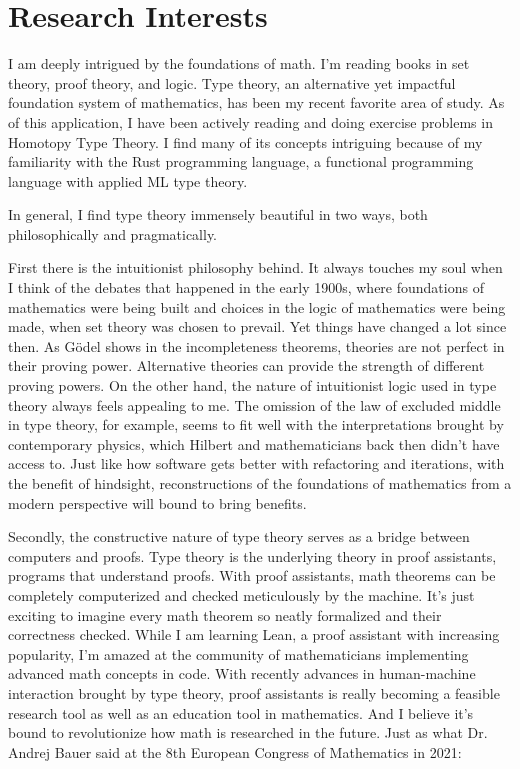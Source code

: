 \section*{Research Interests}

I am deeply intrigued by the foundations of math.
I'm reading books in set theory, proof theory, and logic.
Type theory,
an alternative yet impactful foundation system of mathematics, has been my recent favorite area of study.
As of this application, I have been actively reading and doing exercise problems in Homotopy Type Theory.
I find many of its concepts intriguing because of my familiarity with the Rust programming language,
a functional programming language with applied ML type theory.

In general, I find type theory immensely beautiful in two ways,
both philosophically and pragmatically.

First there is the intuitionist philosophy behind.
It always touches my soul when I think of the debates that
happened in the early 1900s,
where foundations of mathematics were being built
and choices in the logic of mathematics were being made,
when set theory was chosen to prevail.
Yet things have changed a lot since then.
As Gödel shows in the incompleteness theorems,
theories are not perfect in their proving power.
Alternative theories can provide the strength of different proving powers.
On the other hand, the nature of intuitionist logic used in type theory always feels appealing to me.
The omission of the law of excluded middle in type theory, for example,
seems to fit well with the interpretations brought by contemporary physics,
which Hilbert and mathematicians back then didn't have access to.
Just like how software gets better with refactoring and iterations,
with the benefit of hindsight,
reconstructions of the foundations of mathematics from a modern perspective
will bound to bring benefits.

Secondly, the constructive nature of type theory serves as a bridge
between computers and proofs.
Type theory is the underlying theory in proof assistants, programs that understand proofs.
With proof assistants,
math theorems can be completely computerized and checked meticulously by the machine.
It's just exciting to imagine every math theorem so neatly formalized and their correctness checked.
While I am learning Lean,
a proof assistant with increasing popularity,
I'm amazed at the community of mathematicians implementing advanced math concepts in code.
With recently advances in human-machine interaction brought by type theory,
proof assistants is really becoming a feasible research tool as well as an education tool in mathematics.
And I believe it's bound to revolutionize how math is researched in the future.
Just as what Dr. Andrej Bauer said at the 8th European Congress of Mathematics in 2021:

